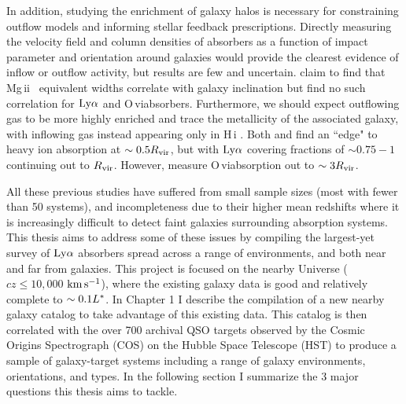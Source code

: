 \documentclass[twocolumn,tighten]{aastex62}
\newcommand{\kms}{$\rm km\, s^{-1}$}
\newcommand{\HI}{\mbox{H\,{\sc i}} }
\newcommand{\II}{\,{\sc ii}}
\newcommand{\VI}{\,{\sc vi}}
\begin{document}
In addition, studying the enrichment of galaxy halos is necessary for constraining outflow models and informing stellar feedback prescriptions. Directly measuring the velocity field and column densities of absorbers as a function of impact parameter and orientation around galaxies would provide the clearest evidence of inflow or outflow activity, but results are few and uncertain. \cite{kacprzak2011_inclination} claim to find that Mg\II~ equivalent widths correlate with galaxy inclination but \cite{mathes2014} find no such correlation for $\rm Ly\alpha$ and O\VI absorbers. Furthermore, we should expect outflowing gas to be more highly enriched and trace the metallicity of the associated galaxy, with inflowing gas instead appearing only in \HI. Both \cite{stocke2013} and \cite{liang2014} find an ``edge" to heavy ion absorption at $\sim 0.5 R_{\rm vir}$, but with $\rm Ly\alpha$ covering fractions of $\sim 0.75 - 1$ continuing out to $R_{\rm vir}$. However, \cite{mathes2014} measure O\VI absorption out to $\sim 3 R_{\rm vir}$.

All these previous studies have suffered from small sample sizes (most with fewer than 50 systems), and incompleteness due to their higher mean redshifts where it is increasingly difficult to detect faint galaxies surrounding absorption systems. This thesis aims to address some of these issues by compiling the largest-yet survey of $\rm Ly\alpha$ absorbers spread across a range of environments, and both near and far from galaxies. This project is focused on the nearby Universe ($cz \leq 10,000$ \kms), where the existing galaxy data is good and relatively complete to $\sim 0.1 L^{\**}$. In Chapter 1 I describe the compilation of a new nearby galaxy catalog to take advantage of this existing data. This catalog is then correlated with the over 700 archival QSO targets observed by the Cosmic Origins Spectrograph (COS) on the Hubble Space Telescope (HST) to produce a sample of galaxy-target systems including a range of galaxy environments, orientations, and types. In the following section I summarize the 3 major questions this thesis aims to tackle.


\end{document}
